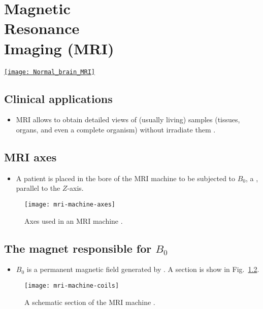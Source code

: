 \chapter[\glsentrylong{MRI} (\glsentryshort{MRI})]{Magnetic\\Resonance\\Imaging (MRI)}
\vspace{-50ex}
\begin{flushright}
\href{https://www.sciencephoto.com/media/728494/view/normal-brain-mri}{\texttt{[image: Normal\_brain\_MRI]}}
\end{flushright}

\section{Clinical applications}
\begin{itemize}
\item \gls{MRI}
  \cite{westbrook2018mri,Wu2022MRI_Physics,thePIRL2018NMR_basics,thePIRL2018SpinEcho,thePIRL2018Fourier,thePIRL2018GRE}
  allows to obtain detailed views of (usually living) samples
  (tissues, organs, and even a complete organism) without irradiate
  them \cite{wikipedia_MRI}.
\end{itemize}

\section{MRI axes}
\begin{itemize}
\item A patient is placed in the bore of the MRI machine to be
  subjected to $B_0$, a , parallel to the $Z$-axis.
\end{itemize}
\vspace{-4ex}
\begin{figure}[!b]
  \centering
  \texttt{[image: mri-machine-axes]}
  \caption{Axes used in an MRI machine \cite{abdulla2025MRI_machine}.}
  \label{fig:MRI_axes}
\end{figure}

\section{The magnet responsible for $B_0$}
\begin{itemize}
\item $B_0$ is a permanent magnetic field generated by . A section is
  show in Fig.~\ref{fig:MRI_machine_scheme}.
\end{itemize}
\vspace{-4ex}
\begin{figure}[!b]
  \centering
  \texttt{[image: mri-machine-coils]}
  \caption{A schematic section of the MRI machine \cite{abdulla2025MRI_machine}.}
  \label{fig:MRI_machine_scheme}
\end{figure}

